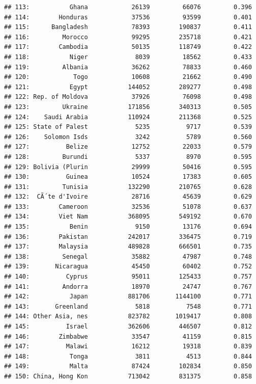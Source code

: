 \documentclass[10pt,]{article}
\begin{document}
\begin{verbatim}
## 113:           Ghana            26139         66076         0.396
## 114:        Honduras            37536         93599         0.401
## 115:      Bangladesh            78393        190837         0.411
## 116:         Morocco            99295        235718         0.421
## 117:        Cambodia            50135        118749         0.422
## 118:           Niger             8039         18562         0.433
## 119:         Albania            36262         78833         0.460
## 120:            Togo            10608         21662         0.490
## 121:           Egypt           144052        289277         0.498
## 122: Rep. of Moldova            37926         76098         0.498
## 123:         Ukraine           171856        340313         0.505
## 124:    Saudi Arabia           110924        211368         0.525
## 125: State of Palest             5235          9717         0.539
## 126:    Solomon Isds             3242          5789         0.560
## 127:          Belize            12752         22033         0.579
## 128:         Burundi             5337          8970         0.595
## 129: Bolivia (Plurin            29999         50416         0.595
## 130:          Guinea            10524         17383         0.605
## 131:         Tunisia           132290        210765         0.628
## 132:  CÃ´te d'Ivoire            28716         45639         0.629
## 133:        Cameroon            32536         51078         0.637
## 134:        Viet Nam           368095        549192         0.670
## 135:           Benin             9150         13176         0.694
## 136:        Pakistan           242017        336475         0.719
## 137:        Malaysia           489828        666501         0.735
## 138:         Senegal            35882         47987         0.748
## 139:       Nicaragua            45450         60402         0.752
## 140:          Cyprus            95011        125433         0.757
## 141:         Andorra            18970         24747         0.767
## 142:           Japan           881706       1144100         0.771
## 143:       Greenland             5818          7548         0.771
## 144: Other Asia, nes           823782       1019417         0.808
## 145:          Israel           362606        446507         0.812
## 146:        Zimbabwe            33547         41159         0.815
## 147:          Malawi            16212         19318         0.839
## 148:           Tonga             3811          4513         0.844
## 149:           Malta            87424        102834         0.850
## 150: China, Hong Kon           713042        831375         0.858

\end{verbatim}
\end{document}
